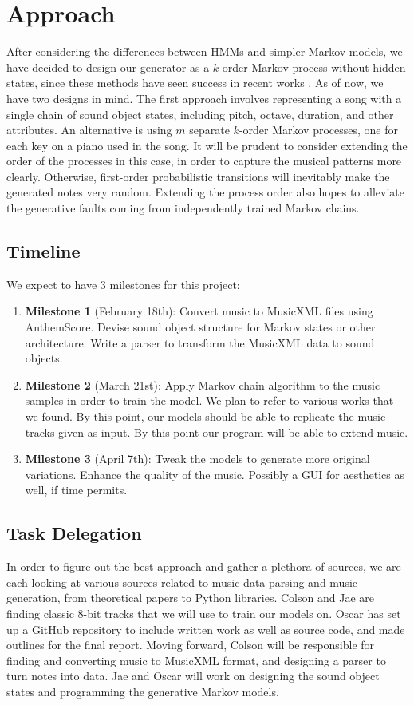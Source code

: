 \documentclass{article}
\begin{document}
\section{Approach}
After considering the differences between HMMs and simpler Markov models, we have decided to design our generator as a $k$-order Markov process without hidden states, 
since these methods have seen success in recent works \cite{shapiro_huber_2021,correa_jungling_small_2020}. As of now, we have two designs in mind. The first approach 
involves representing a song with a single chain of sound object states, including pitch, octave, duration, and other attributes. An alternative is using $m$ separate 
$k$-order Markov processes, one for each key on a piano used in the song. It will be prudent to consider extending the order of the processes in this case, in order to 
capture the musical patterns more clearly. Otherwise, first-order probabilistic transitions will inevitably make the generated notes very random. Extending the process 
order also hopes to alleviate the generative faults coming from independently trained Markov chains.

\subsection{Timeline}
We expect to have 3 milestones for this project:
\begin{enumerate}
  \item \textbf{Milestone 1} (February 18th): Convert music to MusicXML files using AnthemScore. Devise sound object structure for Markov states or other architecture. 
  Write a parser to transform the MusicXML data to sound objects. 
  \item \textbf{Milestone 2} (March 21st): Apply Markov chain algorithm to the music samples in order to train the model. We plan to refer to various works that we found.
  By this point, our models should be able to replicate the music tracks given as input. By this point our program will be able to extend music.
  \item \textbf{Milestone 3} (April 7th): Tweak the models to generate more original variations. Enhance the quality of the music. Possibly a GUI for aesthetics as well, 
  if time permits.
\end{enumerate}

\subsection{Task Delegation}
In order to figure out the best approach and gather a plethora of sources, we are each looking at various sources related to music data parsing and music generation, 
from theoretical papers to Python libraries. Colson and Jae are finding classic 8-bit tracks that we will use to train our models on. Oscar has set up a GitHub repository 
to include written work as well as source code, and made outlines for the final report. Moving forward, Colson will be responsible for finding and converting music to 
MusicXML format, and designing a parser to turn notes into data. Jae and Oscar will work on designing the sound object states and programming the generative Markov models. 
\end{document}
